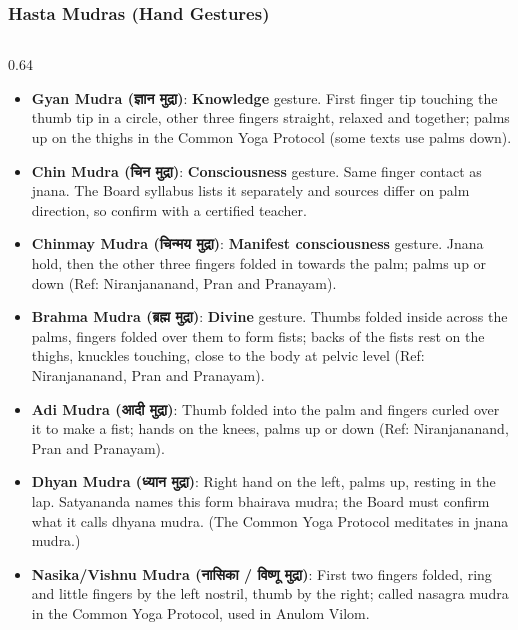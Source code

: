 \begin{frame}[fragile,shrink=6]\frametitle{Hasta Mudras (Hand Gestures)}
\begin{columns}
    \begin{column}[T]{0.64\linewidth}
      \footnotesize
      \begin{itemize}
        \item \textbf{Gyan Mudra (ज्ञान मुद्रा)}: \textbf{Knowledge} gesture. First finger tip touching the thumb tip in a circle, other three fingers straight, relaxed and together; palms up on the thighs in the Common Yoga Protocol (some texts use palms down).
        \item \textbf{Chin Mudra (चिन मुद्रा)}: \textbf{Consciousness} gesture. Same finger contact as jnana. The Board syllabus lists it separately and sources differ on palm direction, so confirm with a certified teacher.
        \item \textbf{Chinmay Mudra (चिन्मय  मुद्रा)}: \textbf{Manifest consciousness} gesture. Jnana hold, then the other three fingers folded in towards the palm; palms up or down (Ref: Niranjananand, Pran and Pranayam).	
		\item \textbf{Brahma Mudra (ब्रह्म   मुद्रा)}: \textbf{Divine} gesture. Thumbs folded inside across the palms, fingers folded over them to form fists; backs of the fists rest on the thighs, knuckles touching, close to the body at pelvic level (Ref: Niranjananand, Pran and Pranayam).
		\item \textbf{Adi Mudra (आदी   मुद्रा)}: Thumb folded into the palm and fingers curled over it to make a fist; hands on the knees, palms up or down (Ref: Niranjananand, Pran and Pranayam).
		\item \textbf{Dhyan Mudra (ध्यान    मुद्रा)}: Right hand on the left, palms up, resting in the lap. Satyananda names this form bhairava mudra; the Board must confirm what it calls dhyana mudra. (The Common Yoga Protocol meditates in jnana mudra.)
		\item \textbf{Nasika/Vishnu Mudra (नासिका / विष्णू     मुद्रा)}: First two fingers folded, ring and little fingers by the left nostril, thumb by the right; called nasagra mudra in the Common Yoga Protocol, used in Anulom Vilom.

\end{itemize}
\end{column}
\end{columns}
\end{frame}
